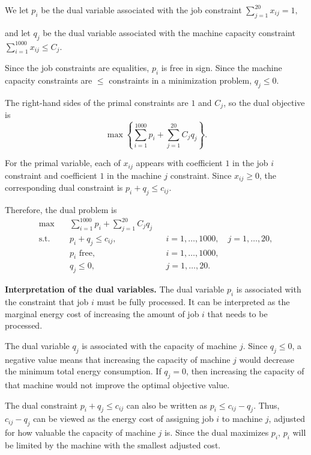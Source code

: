 \documentclass{article}
\begin{document}
We let $p_i$ be the dual variable associated with the job constraint
$
\sum_{j=1}^{20}x_{ij}=1,
$

and let $q_j$ be the dual variable associated with the machine capacity
constraint
$
\sum_{i=1}^{1000}x_{ij}\leq C_j.
$

Since the job constraints are equalities, $p_i$ is free in sign. Since
the machine capacity constraints are $\leq$ constraints in a minimization
problem,
$
q_j\leq0.
$

The right-hand sides of the primal constraints are $1$ and $C_j$, so
the dual objective is
\[
\max \left\{
\sum_{i=1}^{1000}p_i+
\sum_{j=1}^{20}C_jq_j
\right\}.
\]

For the primal variable, each of $x_{ij}$ appears with coefficient $1$ in the job
$i$ constraint and coefficient $1$ in the machine $j$ constraint.
Since $x_{ij}\geq0$, the corresponding dual constraint is
$
p_i+q_j\leq c_{ij}.
$

Therefore, the dual problem is
\[
\boxed{
\begin{aligned}
\max \quad &
\sum_{i=1}^{1000}p_i+
\sum_{j=1}^{20}C_jq_j\\
\text{s.t.}\quad
&p_i+q_j\leq c_{ij},
&& i=1,\ldots,1000,\quad j=1,\ldots,20,\\
&p_i\text{ free},
&& i=1,\ldots,1000,\\
&q_j\leq0,
&& j=1,\ldots,20.
\end{aligned}}
\]


\textbf{Interpretation of the dual variables.} The dual variable $p_i$ is associated with the constraint that job $i$
must be fully processed. It can be interpreted as the marginal energy
cost of increasing the amount of job $i$ that needs to be processed.

The dual variable $q_j$ is associated with the capacity of machine $j$.
Since $q_j\leq 0$, a negative value means that increasing the capacity
of machine $j$ would decrease the minimum total energy consumption. If
$q_j=0$, then increasing the capacity of that machine would not improve
the optimal objective value.

The dual constraint
$
p_i+q_j\leq c_{ij}
$
can also be written as
$
p_i\leq c_{ij}-q_j.
$
Thus, $c_{ij}-q_j$ can be viewed as the energy cost of assigning job
$i$ to machine $j$, adjusted for how valuable the capacity of machine
$j$ is. Since the dual maximizes $p_i$, $p_i$ will be limited by the
machine with the smallest adjusted cost.

\vspace{3mm}
\end{document}
